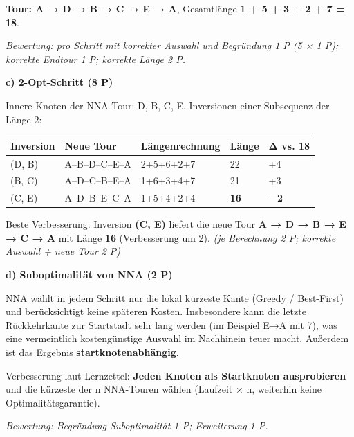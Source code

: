 \documentclass[11pt, a4paper]{article}
\begin{document}
\textbf{Tour: A → D → B → C → E → A}, Gesamtlänge \textbf{1 + 5 + 3 + 2 + 7 = 18}.


\textit{Bewertung: pro Schritt mit korrekter Auswahl und Begründung 1 P (5 × 1 P); korrekte Endtour 1 P; korrekte Länge 2 P.}


\textbf{c) 2-Opt-Schritt (8 P)}


Innere Knoten der NNA-Tour: D, B, C, E. Inversionen einer Subsequenz der Länge 2:



{\small
\begin{tabularx}{\linewidth}{XXXXX}
\hline
\rowcolor{tableheadbg}
{\color{white}\textbf{Inversion}} & {\color{white}\textbf{Neue Tour}} & {\color{white}\textbf{Längenrechnung}} & {\color{white}\textbf{Länge}} & {\color{white}\textbf{Δ vs. 18}} \\[2pt]
\hline
\endhead
\hline
\endfoot
(D, B) & A–B–D–C–E–A & 2+5+6+2+7 & 22 & +4 \\
(B, C) & A–D–C–B–E–A & 1+6+3+4+7 & 21 & +3 \\
(C, E) & A–D–B–E–C–A & 1+5+4+2+4 & \textbf{16} & \textbf{−2} \\
\end{tabularx}
}


Beste Verbesserung: Inversion \textbf{(C, E)} liefert die neue Tour \textbf{A → D → B → E → C → A} mit Länge \textbf{16} (Verbesserung um 2). \textit{(je Berechnung 2 P; korrekte Auswahl + neue Tour 2 P)}


\textbf{d) Suboptimalität von NNA (2 P)}


NNA wählt in jedem Schritt nur die lokal kürzeste Kante (Greedy / Best-First) und berücksichtigt keine späteren Kosten. Insbesondere kann die letzte Rückkehrkante zur Startstadt sehr lang werden (im Beispiel E→A mit 7), was eine vermeintlich kostengünstige Auswahl im Nachhinein teuer macht. Außerdem ist das Ergebnis \textbf{startknotenabhängig}.


Verbesserung laut Lernzettel: \textbf{Jeden Knoten als Startknoten ausprobieren} und die kürzeste der n NNA-Touren wählen (Laufzeit × n, weiterhin keine Optimalitätsgarantie).


\textit{Bewertung: Begründung Suboptimalität 1 P; Erweiterung 1 P.}





\end{document}
